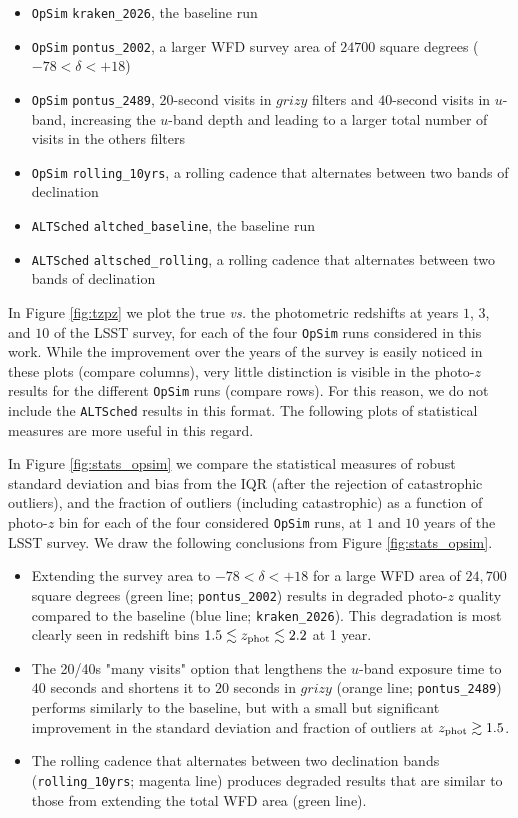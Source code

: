 \begin{itemize}
\item {\tt OpSim} {\tt kraken\_2026}, the baseline run
\item {\tt OpSim} {\tt pontus\_2002}, a larger WFD survey area of $24700$ square degrees ($-78 < \delta < +18$)
\item {\tt OpSim} {\tt pontus\_2489}, $20$-second visits in $grizy$ filters and $40$-second visits in $u$-band, increasing the $u$-band depth and leading to a larger total number of visits in the others filters
\item {\tt OpSim} {\tt rolling\_10yrs}, a rolling cadence that alternates between two bands of declination
\item {\tt ALTSched} {\tt altched\_baseline}, the baseline run
\item {\tt ALTSched} {\tt altsched\_rolling}, a rolling cadence that alternates between two bands of declination
\end{itemize}

In Figure \ref{fig:tzpz} we plot the true {\it vs.} the photometric redshifts at years $1$, $3$, and $10$ of the LSST survey, for each of the four {\tt OpSim} runs considered in this work. While the improvement over the years of the survey is easily noticed in these plots (compare columns), very little distinction is visible in the photo-$z$ results for the different {\tt OpSim} runs (compare rows). For this reason, we do not include the {\tt ALTSched} results in this format. The following plots of statistical measures are more useful in this regard.

In Figure \ref{fig:stats_opsim} we compare the statistical measures of robust standard deviation and bias from the IQR (after the rejection of catastrophic outliers), and the fraction of outliers (including catastrophic) as a function of photo-$z$ bin for each of the four considered {\tt OpSim} runs, at $1$ and $10$ years of the LSST survey. We draw the following conclusions from Figure \ref{fig:stats_opsim}. 
\begin{itemize}
\item Extending the survey area to $-78 < \delta < +18$ for a large WFD area of $24,700$ square degrees (green line; {\tt pontus\_2002}) results in degraded photo-$z$ quality compared to the baseline (blue line; {\tt kraken\_2026}). This degradation is most clearly seen in redshift bins $1.5 \lesssim z_{\rm phot} \lesssim 2.2$ at 1 year.
\item The 20/40s "many visits" option that lengthens the $u$-band exposure time to $40$ seconds and shortens it to $20$ seconds in $grizy$ (orange line; {\tt pontus\_2489}) performs similarly to the baseline, but with a small but significant improvement in the standard deviation and fraction of outliers at $z_{\rm phot} \gtrsim 1.5$.
\item The rolling cadence that alternates between two declination bands ({\tt rolling\_10yrs}; magenta line) produces degraded results that are similar to those from extending the total WFD area (green line).
\end{itemize}

